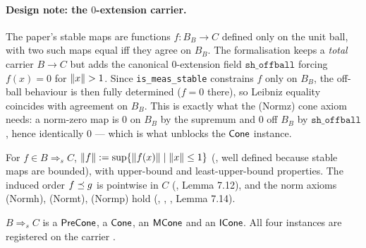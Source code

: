 \paragraph{Design note: the \texorpdfstring{$0$}{0}-extension carrier.}
The paper's stable maps are functions $f : B_B \to C$ defined only on
the unit ball, with two such maps equal iff they agree on $B_B$. The
formalisation keeps a \emph{total} carrier $B \to C$ but adds the
canonical $0$-extension field $\texttt{sh\_offball}$ forcing $f(x) = 0$
for $\lVert x \rVert > 1$. Since \texttt{is\_meas\_stable} constrains $f$ only
on $B_B$, the off-ball behaviour is then fully determined ($f = 0$
there), so Leibniz equality coincides with agreement on $B_B$. This is
exactly what the (Normz) cone axiom needs: a norm-zero map is $0$ on
$B_B$ by the supremum and $0$ off $B_B$ by $\texttt{sh\_offball}$, hence
identically $0$ --- which is what unblocks the $\mathsf{Cone}$ instance.

\begin{lemma}
\label{lem:sh-norm}
\rocqok{}
For $f \in B \mathbin{\Rightarrow_s} C$,
$\lVert f \rVert := \sup\{\lVert f(x) \rVert \mid \lVert x \rVert \leq 1\}$
(, well defined because stable
maps are bounded), with upper-bound
 and least-upper-bound
 properties. The induced order
$f \preceq g$ is pointwise in $C$
(, Lemma 7.12), and the
norm axioms (Normh), (Normt), (Normp) hold
(,
,
, Lemma 7.14).
\end{lemma}

\begin{theorem}
\label{thm:stablehom-icone}
\rocqok
{}
$B \mathbin{\Rightarrow_s} C$ is a $\mathsf{PreCone}$, a $\mathsf{Cone}$, an $\mathsf{MCone}$ and
an $\mathsf{ICone}$. All four \HB{} instances are registered on the carrier
.
\end{theorem}

